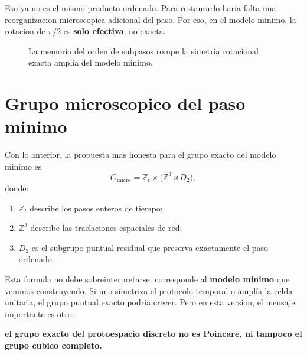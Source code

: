 Eso ya no es el mismo producto ordenado. Para restaurarlo haria falta una reorganizacion microscopica adicional del paso. Por eso, en el modelo minimo, la rotacion de \(\pi/2\) es \textbf{solo efectiva}, no exacta.

\begin{figure}[h!]
\centering
{}
\caption{La memoria del orden de subpasos rompe la simetria rotacional exacta amplia del modelo minimo.}
\end{figure}

\section{Grupo microscopico del paso minimo}
Con lo anterior, la propuesta mas honesta para el grupo exacto del modelo minimo es
\begin{equation}
G_{\mathrm{micro}}=
\mathbb{Z}_t\times\bigl(\mathbb{Z}^3\rtimes D_2\bigr),
\label{c25:eq:Gmicro}
\end{equation}
donde:
\begin{enumerate}[label=\arabic*.]
    \item \(\mathbb{Z}_t\) describe los pasos enteros de tiempo;
    \item \(\mathbb{Z}^3\) describe las traslaciones espaciales de red;
    \item \(D_2\) es el subgrupo puntual residual que preserva exactamente el paso ordenado.
\end{enumerate}

Esta formula no debe sobreinterpretarse: corresponde al \textbf{modelo minimo} que venimos construyendo. Si uno simetriza el protocolo temporal o amplía la celda unitaria, el grupo puntual exacto podria crecer. Pero en esta version, el mensaje importante es otro:
\begin{displayquote}
\textbf{el grupo exacto del protoespacio discreto no es Poincare, ni tampoco el grupo cubico completo.}
\end{displayquote}

